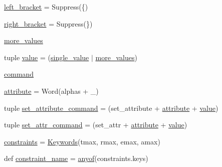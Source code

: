 \begin{DoxyCompactItemize}
\item 
\hyperlink{namespacesylva_1_1misc_1_1tcl__parser_a9da481e2e9eb38c1443d778d3f18a4d3}{left\+\_\+bracket} = Suppress(\textquotesingle{}\{\textquotesingle{})
\item 
\hyperlink{namespacesylva_1_1misc_1_1tcl__parser_ac64e684e7c1d68a9629eb9892e36ba11}{right\+\_\+bracket} = Suppress(\textquotesingle{}\}\textquotesingle{})
\item 
\hyperlink{namespacesylva_1_1misc_1_1tcl__parser_a400beccbf593cc4495fdd7ab101acb39}{more\+\_\+values}
\item 
tuple \hyperlink{namespacesylva_1_1misc_1_1tcl__parser_a83a1a4d978bc1a8a1bd92f71b754bad9}{value} = (\hyperlink{namespacesylva_1_1misc_1_1tcl__parser_a92069bbdbd952a10c724671781cfcfd6}{single\+\_\+value} $\vert$ \hyperlink{namespacesylva_1_1misc_1_1tcl__parser_a400beccbf593cc4495fdd7ab101acb39}{more\+\_\+values})
\item 
\hyperlink{namespacesylva_1_1misc_1_1tcl__parser_a5c0cde73a595ea661179ea225ff2ceba}{command}
\item 
\hyperlink{namespacesylva_1_1misc_1_1tcl__parser_ade6aa1a9697fd50d76f10d8ef7474363}{attribute} = Word(alphas + \textquotesingle{}\+\_\+\textquotesingle{})
\item 
tuple \hyperlink{namespacesylva_1_1misc_1_1tcl__parser_a41d78ece735b8cfe1b91e423ca73f72f}{set\+\_\+attribute\+\_\+command} = (set\+\_\+attribute + \hyperlink{namespacesylva_1_1misc_1_1tcl__parser_ade6aa1a9697fd50d76f10d8ef7474363}{attribute} + \hyperlink{namespacesylva_1_1misc_1_1tcl__parser_a83a1a4d978bc1a8a1bd92f71b754bad9}{value})
\item 
tuple \hyperlink{namespacesylva_1_1misc_1_1tcl__parser_a310173d7899d08bcad2ec9f671348bf3}{set\+\_\+attr\+\_\+command} = (set\+\_\+attr + \hyperlink{namespacesylva_1_1misc_1_1tcl__parser_ade6aa1a9697fd50d76f10d8ef7474363}{attribute} + \hyperlink{namespacesylva_1_1misc_1_1tcl__parser_a83a1a4d978bc1a8a1bd92f71b754bad9}{value})
\item 
\hyperlink{namespacesylva_1_1misc_1_1tcl__parser_ab38ad19d9c0cfc5c8f60d8cabbdeb0e5}{constraints} = \hyperlink{classsylva_1_1misc_1_1tcl__parser_1_1_keywords}{Keywords}(\textquotesingle{}tmax\textquotesingle{}, \textquotesingle{}rmax\textquotesingle{}, \textquotesingle{}emax\textquotesingle{}, \textquotesingle{}amax\textquotesingle{})
\item 
def \hyperlink{namespacesylva_1_1misc_1_1tcl__parser_a0e59a913865b08b792584c609dd496c1}{constraint\+\_\+name} = \hyperlink{namespacesylva_1_1misc_1_1tcl__parser_abc9d84dd4132e13b642242dfac628084}{anyof}(constraints.\+keys)

\end{DoxyCompactItemize}
